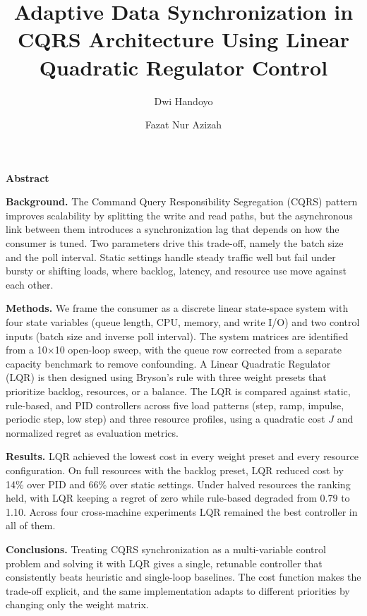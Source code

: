 \documentclass[10pt,a4paper]{article}
\title{\bfseries Adaptive Data Synchronization in CQRS Architecture Using Linear Quadratic Regulator Control}
\author[1]{Dwi Handoyo}
\author[1]{Fazat Nur Azizah}
\affil[1]{School of Electrical Engineering and Informatics, Institut Teknologi Bandung, Indonesia}
\date{}
\begin{document}
\maketitle
\thispagestyle{empty}

\noindent\textbf{Abstract}

\medskip

\noindent\textbf{Background.} The Command Query Responsibility Segregation (CQRS) pattern improves scalability by splitting the write and read paths, but the asynchronous link between them introduces a synchronization lag that depends on how the consumer is tuned. Two parameters drive this trade-off, namely the batch size and the poll interval. Static settings handle steady traffic well but fail under bursty or shifting loads, where backlog, latency, and resource use move against each other.

\medskip

\noindent\textbf{Methods.} We frame the consumer as a discrete linear state-space system with four state variables (queue length, CPU, memory, and write I/O) and two control inputs (batch size and inverse poll interval). The system matrices are identified from a 10$\times$10 open-loop sweep, with the queue row corrected from a separate capacity benchmark to remove confounding. A Linear Quadratic Regulator (LQR) is then designed using Bryson's rule with three weight presets that prioritize backlog, resources, or a balance. The LQR is compared against static, rule-based, and PID controllers across five load patterns (step, ramp, impulse, periodic step, low step) and three resource profiles, using a quadratic cost $J$ and normalized regret as evaluation metrics.

\medskip

\noindent\textbf{Results.} LQR achieved the lowest cost in every weight preset and every resource configuration. On full resources with the backlog preset, LQR reduced cost by 14\% over PID and 66\% over static settings. Under halved resources the ranking held, with LQR keeping a regret of zero while rule-based degraded from 0.79 to 1.10. Across four cross-machine experiments LQR remained the best controller in all of them.

\medskip

\noindent\textbf{Conclusions.} Treating CQRS synchronization as a multi-variable control problem and solving it with LQR gives a single, retunable controller that consistently beats heuristic and single-loop baselines. The cost function makes the trade-off explicit, and the same implementation adapts to different priorities by changing only the weight matrix.
\end{document}
